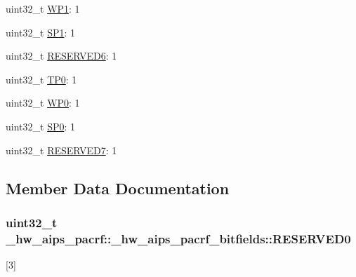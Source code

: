 \begin{DoxyCompactItemize}
\item 
uint32\+\_\+t \hyperlink{struct__hw__aips__pacrf_1_1__hw__aips__pacrf__bitfields_aa568c2793098174529feb2ab5de81d31}{W\+P1}\+: 1
\item 
uint32\+\_\+t \hyperlink{struct__hw__aips__pacrf_1_1__hw__aips__pacrf__bitfields_a088b16d73aa1e88cea02ea51ac135399}{S\+P1}\+: 1
\item 
uint32\+\_\+t \hyperlink{struct__hw__aips__pacrf_1_1__hw__aips__pacrf__bitfields_a72d82ccb708f90f09721ff8e4bf9d28f}{R\+E\+S\+E\+R\+V\+E\+D6}\+: 1
\item 
uint32\+\_\+t \hyperlink{struct__hw__aips__pacrf_1_1__hw__aips__pacrf__bitfields_ad54a165fb44af28189108328c86cf498}{T\+P0}\+: 1
\item 
uint32\+\_\+t \hyperlink{struct__hw__aips__pacrf_1_1__hw__aips__pacrf__bitfields_aad90e31b136f5f58563f6dc7786c1331}{W\+P0}\+: 1
\item 
uint32\+\_\+t \hyperlink{struct__hw__aips__pacrf_1_1__hw__aips__pacrf__bitfields_a828d752554263ff1da6efd81bddf9e40}{S\+P0}\+: 1
\item 
uint32\+\_\+t \hyperlink{struct__hw__aips__pacrf_1_1__hw__aips__pacrf__bitfields_ac823c1f234dcbbf195fe9b632aa9f00c}{R\+E\+S\+E\+R\+V\+E\+D7}\+: 1
\end{DoxyCompactItemize}


\subsection{Member Data Documentation}
\subsubsection[{\texorpdfstring{R\+E\+S\+E\+R\+V\+E\+D0}{RESERVED0}}]{\setlength{\rightskip}{0pt plus 5cm}uint32\+\_\+t \+\_\+hw\+\_\+aips\+\_\+pacrf\+::\+\_\+hw\+\_\+aips\+\_\+pacrf\+\_\+bitfields\+::\+R\+E\+S\+E\+R\+V\+E\+D0}\hypertarget{struct__hw__aips__pacrf_1_1__hw__aips__pacrf__bitfields_a80a3674d6c99ebf2a2c918364d848f6a}{}\label{struct__hw__aips__pacrf_1_1__hw__aips__pacrf__bitfields_a80a3674d6c99ebf2a2c918364d848f6a}
\mbox{[}3\mbox{]} 
